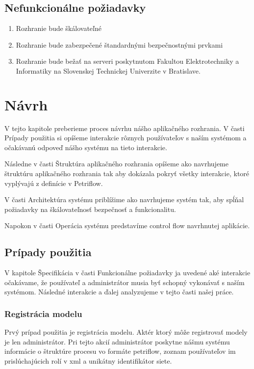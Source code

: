 \subsection{Nefunkcionálne požiadavky}
\begin{enumerate}
\item Rozhranie bude škálovateľné
\item Rozhranie bude zabezpečené štandardnými bezpečnostnými prvkami
\item Rozhranie bude bežať na serveri poskytnutom Fakultou Elektrotechniky a Informatiky na Slovenskej Technickej Univerzite v Bratislave.
\end{enumerate}

\section{Návrh}
V tejto kapitole preberieme proces návrhu nášho aplikačného rozhrania. V časti Prípady použitia si opíšeme interakcie rôznych používateľov s naším systémom a očakávanú odpoveď nášho systému na tieto interakcie.

Následne v časti Štruktúra aplikačného rozhrania opíšeme ako navrhujeme štruktúru aplikačného rozhrania tak aby dokázala pokryť všetky interakcie, ktoré vyplývajú z definície v Petriflow. 

V časti Architektúra systému priblížime ako navrhujeme systém tak, aby spĺňal požiadavky na škálovateľnosť bezpečnosť a funkcionalitu.

Napokon v časti Operácia systému predstavíme control flow navrhnutej aplikácie.


\subsection{Prípady použitia} \label{usecases}
V kapitole Špecifikácia v časti Funkcionálne požiadavky ja uvedené aké interakcie očakávame, že používateľ a administrátor musia byť schopný vykonávať s naším systémom. Následné interakcie a ďalej analyzujeme v tejto časti našej práce. 

\subsubsection{Registrácia modelu}
Prvý prípad použitia je registrácia modelu. Aktér ktorý môže registrovať modely je len administrátor. Pri tejto akcií administrátor poskytne nášmu systému informácie o štruktúre procesu vo formáte petriflow, zoznam používateľov im prislúchajúcich rolí v \acrshort{xml} a unikátny identifikátor siete.

